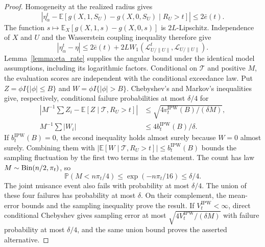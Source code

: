 \documentclass[12pt]{article}
\theoremstyle{plain}
\theoremstyle{definition}
\begin{document}
\begin{proof}
Homogeneity at the realized radius gives 
\[
|\eta_\alpha^t-\mathbb E[g(X,1,S_U)-g(X,0,S_U)\mid R_U>t]|\leq2\bar e(t).
\]
 The function $s\mapsto\mathbb E_X[g(X,1,s)-g(X,0,s)]$ is $2L$-Lipschitz. Independence of $X$ and $U$ and the Wasserstein coupling inequality therefore give 
\[
|\eta_\alpha^t-\eta|\leq2\bar e(t)+2L W_1(\mathcal L_{U/\|U\|}^t,\mathcal L_{U/\|U\|}).
\]
 Lemma~\ref{lemma:eta_rate} supplies the angular bound under the identical model assumptions, including its logarithmic factors. Conditional on $\mathcal T$ and positive $M$, the evaluation scores are independent with the conditional exceedance law. Put $Z=\phi I\{|\phi|\leq B\}$ and $W=\phi I\{|\phi|>B\}$. Chebyshev's and Markov's inequalities give, respectively, conditional failure probabilities at most $\delta/4$ for 
\[
\begin{aligned} \left|M^{-1}\sum Z_i-\mathbb E[Z\mid\mathcal T,R_U>t]\right|&\leq\sqrt{4v_t^{\text{IPW}}(B)/(\delta M)},\\ M^{-1}\sum|W_i|&\leq4b_t^{\text{IPW}}(B)/\delta.\end{aligned}
\]
 If $b_t^{\text{IPW}}(B)=0$, the second inequality holds almost surely because $W=0$ almost surely. Combining them with $|\mathbb E[W\mid\mathcal T,R_U>t]|\leq b_t^{\text{IPW}}(B)$ bounds the sampling fluctuation by the first two terms in the statement. The count has law $M\sim\operatorname{Bin}(n/2,\pi_t)$, so 
\[
\mathbb P(M<n\pi_t/4)\leq\exp(-n\pi_t/16)\leq\delta/4.
\]
 The joint nuisance event also fails with probability at most $\delta/4$. The union of these four failures has probability at most $\delta$. On their complement, the mean-error bounds and the sampling inequality prove the result. If $V_t^{\text{IPW}}<\infty$, direct conditional Chebyshev gives sampling error at most $\sqrt{4V_t^{\text{IPW}}/(\delta M)}$ with failure probability at most $\delta/4$, and the same union bound proves the asserted alternative.   
\end{proof}
\end{document}
